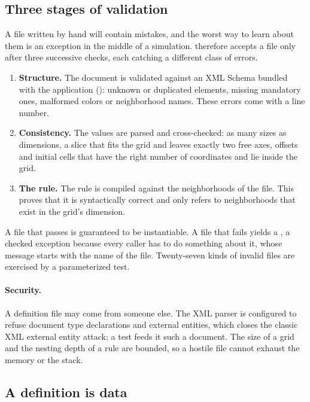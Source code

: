\subsection{Three stages of validation}

A file written by hand will contain mistakes, and the worst way to learn about them is an
exception in the middle of a simulation.  therefore accepts a file only
after three successive checks, each catching a different class of errors.

\begin{enumerate}
    \item \textbf{Structure.} The document is validated against an XML Schema bundled with the
          application (): unknown or duplicated elements, missing mandatory ones,
          malformed colors or neighborhood names. These errors come with a line number.
    \item \textbf{Consistency.} The values are parsed and cross-checked: as many sizes as
          dimensions, a slice that fits the grid and leaves exactly two free axes, offsets and initial
          cells that have the right number of coordinates and lie inside the grid.
    \item \textbf{The rule.} The rule is compiled against the neighborhoods of the file. This proves
          that it is syntactically correct and only refers to neighborhoods that exist in the grid's
          dimension.
\end{enumerate}

A file that passes is guaranteed to be instantiable. A file that fails yields a
, a checked exception because every caller has to do something about
it, whose message starts with the name of the file. Twenty-seven kinds of invalid files are
exercised by a parameterized test.

\paragraph{Security.} A definition file may come from someone else. The XML parser is configured
to refuse document type declarations and external entities, which closes the classic XML external
entity attack; a test feeds it such a document. The size of a grid and the nesting depth of a
rule are bounded, so a hostile file cannot exhaust the memory or the stack.

\subsection{A definition is data}

